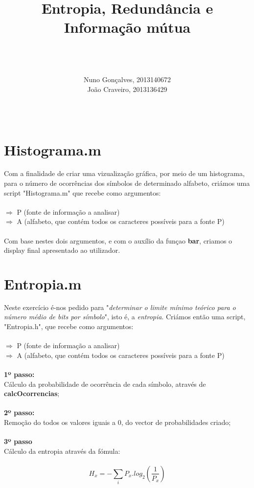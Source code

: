 \documentclass{article}
\begin{document}
\title{\bfseries{}Entropia, Redundância e \\Informação mútua}

\author{\\ \\ \\Nuno Gonçalves, 2013140672 \\ João Craveiro, 2013136429 \\ \\ \\ }

\maketitle

\newpage

\section{Histograma.m}
Com a finalidade de criar uma vizualização gráfica, por meio de um histograma, para o número de ocorrências dos símbolos de determinado alfabeto, criámos uma script "Histograma.m" que recebe como argumentos:\\\\
$\Rightarrow$ P (fonte de informação a analisar)\\
$\Rightarrow$ A (alfabeto, que contém todos os caracteres possíveis para a fonte P)\\\\
Com base nestes dois argumentos, e com o auxílio da funçao \textbf{bar}, criamos o display final apresentado ao utilizador.

\section{Entropia.m}

Neste exercício é-nos pedido para "\textit{determinar o limite mínimo teórico para o número médio de bits por símbolo}", isto é, a \textit{entropia}. Criámos então uma script, "Entropia.h", que recebe como argumentos:\\\\
$\Rightarrow$ P (fonte de informação a analisar)\\
$\Rightarrow$ A (alfabeto, que contém todos os caracteres possíveis para a fonte P)\\\\
\textbf{1º passo:}\\
Cálculo da probabilidade de ocorrência de cada símbolo, através de \textbf{calcOcorrencias};\\\\
\textbf{2º passo:}\\
Remoção do todos os valores iguais a 0, do vector de probabilidades criado;\\\\
\textbf{3º passo}\\
Cálculo da entropia através da fómula:\\\\
\[
H_x = -\sum_i P_x . log_2 \left(\frac{1}{P_x}\right)
\]
\end{document}
